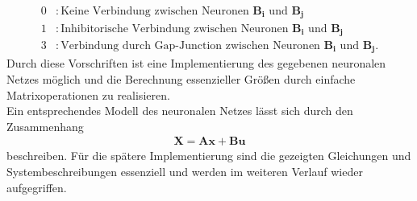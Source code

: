 	\begin{align*}
		0 &: \text{Keine Verbindung zwischen Neuronen }\boldsymbol{B_i}\text{ und } \boldsymbol{B_j}\\
		1 &: \text{Inhibitorische Verbindung zwischen Neuronen }\boldsymbol{B_i}\text{ und }\boldsymbol{B_j}\\
		3 &: \text{Verbindung durch Gap-Junction zwischen Neuronen }\boldsymbol{B_i}\text{ und }\boldsymbol{B_j}.
	\end{align*}
	Durch diese Vorschriften ist eine Implementierung des gegebenen neuronalen Netzes möglich und die Berechnung essenzieller Größen durch einfache Matrixoperationen zu realisieren.\\
	Ein entsprechendes Modell des neuronalen Netzes lässt sich durch den Zusammenhang
	\begin{align}
		\boldsymbol{X} = \boldsymbol{A}\boldsymbol{x} + \boldsymbol{B}\boldsymbol{u}
	\end{align}
	beschreiben. Für die spätere Implementierung sind die gezeigten Gleichungen und Systembeschreibungen essenziell und werden im weiteren Verlauf wieder aufgegriffen.

